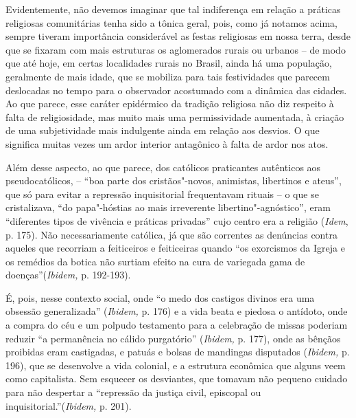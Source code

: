 Evidentemente, não devemos imaginar que tal indiferença em relação a
práticas religiosas comunitárias tenha sido a tônica geral, pois, como
já notamos acima, sempre tiveram importância considerável as festas
religiosas em nossa terra, desde que se fixaram com mais estruturas os
aglomerados rurais ou urbanos -- de modo que até hoje, em certas
localidades rurais no Brasil, ainda há uma população, geralmente de mais
idade, que se mobiliza para tais festividades que parecem deslocadas no
tempo para o observador acostumado com a dinâmica das cidades. Ao que
parece, esse caráter epidérmico da tradição religiosa não diz respeito à
falta de religiosidade, mas muito mais uma permissividade aumentada, à
criação de uma subjetividade mais indulgente ainda em relação aos
desvios. O que significa muitas vezes um ardor interior antagônico à
falta de ardor nos atos.

Além desse aspecto, ao que parece, dos católicos praticantes autênticos
aos pseudocatólicos, -- ``boa parte dos cristãos"-novos, animistas,
libertinos e ateus'', que só para evitar a repressão inquisitorial
frequentavam rituais -- o que se cristalizava, ``do papa"-hóstias ao mais
irreverente libertino"-agnóstico'', eram ``diferentes tipos de vivência e
práticas privadas'' cujo centro era a religião (\emph{Idem}, p. 175).
Não necessariamente católica, já que são correntes as denúncias contra
aqueles que recorriam a feiticeiros e feiticeiras quando ``os exorcismos
da Igreja e os remédios da botica não surtiam efeito na cura de
variegada gama de doenças''(\emph{Ibidem,} p. 192-193).

É, pois, nesse contexto social, onde ``o medo dos castigos divinos era
uma obsessão generalizada'' (\emph{Ibidem,} p. 176) e a vida beata e
piedosa o antídoto, onde a compra do céu e um polpudo testamento para a
celebração de missas poderiam reduzir ``a permanência no cálido
purgatório'' (\emph{Ibidem,} p. 177), onde as bênçãos proibidas eram
castigadas, e patuás e bolsas de mandingas disputados (\emph{Ibidem,} p.
196), que se desenvolve a vida colonial, e a estrutura econômica que
alguns veem como capitalista. Sem esquecer os desviantes, que tomavam
não pequeno cuidado para não despertar a ``repressão da justiça civil,
episcopal ou inquisitorial.''(\emph{Ibidem,} p. 201).

